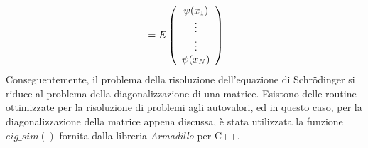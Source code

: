 \documentclass[11pt,a4paper]{article}
\begin{document}
\[
\\ 
 = E\left( \begin{array}{c}
\psi(x_1) \\ \vdots \\ \vdots \\ \psi(x_N)
\end{array} \right)
\]
Conseguentemente, il problema della risoluzione dell'equazione di Schr\"{o}dinger si riduce al problema della diagonalizzazione di una matrice. Esistono delle routine ottimizzate per la risoluzione di problemi agli autovalori, ed in questo caso, per la diagonalizzazione della matrice appena discussa, è stata utilizzata la funzione $eig\_sim()$ fornita dalla libreria \emph{Armadillo} per C++. 
\end{document}
